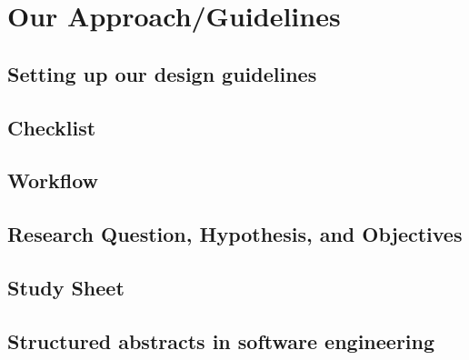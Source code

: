 
\section{Our Approach/Guidelines}

\subsection{Setting up our design guidelines}



\newpage
\subsection{Checklist}

\newpage
\subsection{Workflow}




\newpage
\subsection{Research Question, Hypothesis, and Objectives}




\subsection{Study Sheet}



\newpage
\subsection{Structured abstracts in software engineering}







